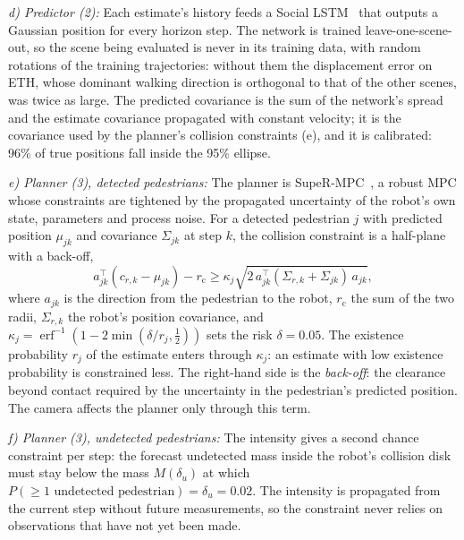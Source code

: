 \documentclass[letterpaper, 10 pt, conference]{ieeeconf}
\begin{document}
\textit{d) Predictor (2):} Each estimate's history feeds a Social LSTM~\cite{alahi2016social} that outputs a Gaussian position for every horizon step. The network is trained leave-one-scene-out, so the scene being evaluated is never in its training data, with random rotations of the training trajectories: without them the displacement error on ETH, whose dominant walking direction is orthogonal to that of the other scenes, was twice as large. The predicted covariance is the sum of the network's spread and the estimate covariance propagated with constant velocity; it is the covariance used by the planner's collision constraints (e), and it is calibrated: 96\% of true positions fall inside the 95\% ellipse.

\textit{e) Planner (3), detected pedestrians:} The planner is SupeR-MPC~\cite{zhu2025robust}, a robust MPC whose constraints are tightened by the propagated uncertainty of the robot's own state, parameters and process noise. For a detected pedestrian $j$ with predicted position $\mu_{jk}$ and covariance $\Sigma_{jk}$ at step $k$, the collision constraint is a half-plane with a back-off,
\begin{equation}
a_{jk}^\top(c_{r,k}-\mu_{jk}) - r_\text{c} \ge \kappa_j \sqrt{2\,a_{jk}^\top(\Sigma_{r,k}+\Sigma_{jk})\,a_{jk}},
\label{eq:cc}
\end{equation}
where $a_{jk}$ is the direction from the pedestrian to the robot, $r_\text{c}$ the sum of the two radii, $\Sigma_{r,k}$ the robot's position covariance, and $\kappa_j=\operatorname{erf}^{-1}(1-2\min(\delta/r_j,\tfrac12))$ sets the risk $\delta{=}0.05$. The existence probability $r_j$ of the estimate enters through $\kappa_j$: an estimate with low existence probability is constrained less. The right-hand side is the \emph{back-off}: the clearance beyond contact required by the uncertainty in the pedestrian's predicted position. The camera affects the planner only through this term.

\textit{f) Planner (3), undetected pedestrians:} The intensity gives a second chance constraint per step: the forecast undetected mass inside the robot's collision disk must stay below the mass $M(\delta_u)$ at which $P(\ge 1 \text{ undetected pedestrian}) = \delta_u{=}0.02$. The intensity is propagated from the current step without future measurements, so the constraint never relies on observations that have not yet been made.
\end{document}

